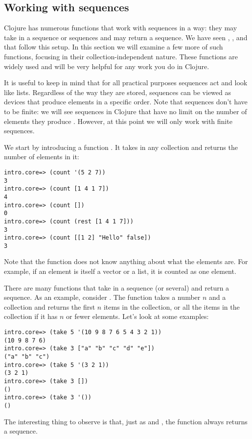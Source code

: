 \subsection{Working with sequences}\label{subsec:sequences}
Clojure has numerous functions that work with sequences in a  way: they may take in a sequence or sequences and may return a sequence. We have seen , , and  that follow this setup. In this section we will examine a few more of such functions, focusing in their collection-independent nature. These functions are widely used and will be very helpful for any work you do in Clojure. 

It is useful to keep in mind that for all practical purposes sequences act and look like lists. Regardless of the way they are stored, sequences can be viewed as devices that produce elements in a specific order. Note that sequences don't have to be finite: we will see  sequences in Clojure that have no limit on the number of elements they produce . However, at this point we will only work with finite sequences. 

We start by introducing a function . It takes in any collection and returns the number of elements in it:
\begin{framed}
\begin{verbatim}
intro.core=> (count '(5 2 7))
3
intro.core=> (count [1 4 1 7])
4
intro.core=> (count [])
0
intro.core=> (count (rest [1 4 1 7]))
3
intro.core=> (count [[1 2] "Hello" false])
3
\end{verbatim}
\end{framed}
Note that the function does not know anything about what the elements are. For example, if an element is itself a vector or a list, it is counted as one element. 

There are many functions that take in a sequence (or several) and return a sequence. As an example, consider . The function takes a number $n$ and a collection and returns the first $n$ items in the collection, or all the items in the collection if it has $n$ or fewer elements. Let's look at some examples:
\begin{framed}
\begin{verbatim}
intro.core=> (take 5 '(10 9 8 7 6 5 4 3 2 1))
(10 9 8 7 6)
intro.core=> (take 3 ["a" "b" "c" "d" "e"])
("a" "b" "c")
intro.core=> (take 5 '(3 2 1))
(3 2 1)
intro.core=> (take 3 [])
()
intro.core=> (take 3 '())
()
\end{verbatim}
\end{framed} 
The interesting thing to observe is that, just as  and , the function  always returns a sequence. 

